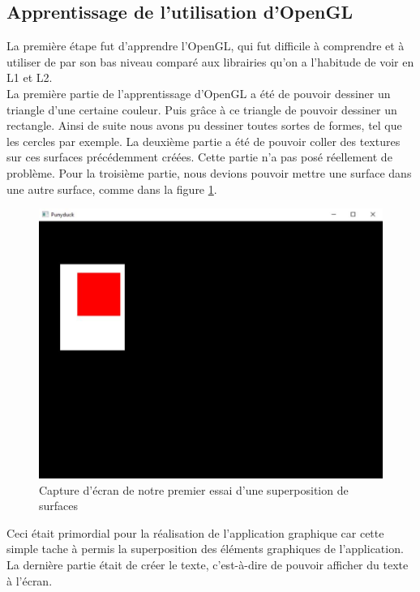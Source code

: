 \documentclass{report}
\begin{document}
\subsection{Apprentissage de l'utilisation d'OpenGL}
La première étape fut d'apprendre l'OpenGL, qui fut difficile à comprendre et à utiliser de par son bas niveau comparé aux librairies qu'on a l'habitude de voir en L1 et L2. \\
La première partie de l'apprentissage d'OpenGL a été de pouvoir dessiner un triangle d'une certaine couleur. Puis grâce à ce triangle de pouvoir dessiner un rectangle. Ainsi de suite nous avons pu dessiner toutes sortes de formes, tel que les cercles par exemple.
La deuxième partie a été de pouvoir coller des textures sur ces surfaces précédemment créées. Cette partie n'a pas posé réellement de problème.
Pour la troisième partie, nous devions pouvoir mettre une surface dans une autre surface, comme dans la figure \ref{exsurface}.
\begin{figure}
    \begin{center}
        \includegraphics[scale=0.3]{exempleSurface.jpg}
        \caption{Capture d'écran de notre premier essai d'une superposition de surfaces}
        \label{exsurface}
    \end{center}
\end{figure}
Ceci était primordial pour la réalisation de l'application graphique car cette simple tache à permis la superposition des éléments graphiques de l'application. \\
La dernière partie était de créer le texte, c'est-à-dire de pouvoir afficher du texte à l'écran. \\
\end{document}

